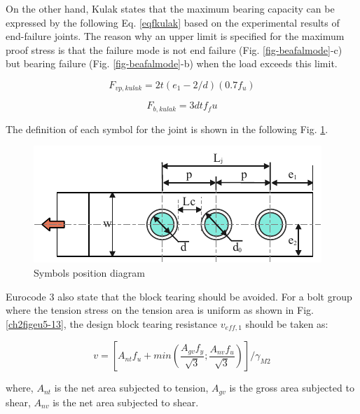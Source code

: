 On the other hand, Kulak \cite{Kulak1988guide} states that the maximum bearing capacity can be expressed by the following Eq. \ref{eqfkulak} based on the experimental results of end-failure joints. The reason why an upper limit is specified for the maximum proof stress is that the failure mode is not end failure (Fig. \ref{fig-beafalmode}-c) but bearing failure (Fig. \ref{fig-beafalmode}-b) when the load exceeds this limit.

\begin{equation}\label{eqfkulak}
    F_{vp,kulak}=2t(e_1-2/d)(0.7f_u)
\end{equation}

\begin{equation}
    F_{b,kulak}=3dtf_fu
\end{equation}

The definition of each symbol for the joint is shown in the following Fig. \ref{fig-symbol}.

\begin{figure}[htbp]
    \centering
    \includegraphics[width=0.7\linewidth]{imgs//ch2/symbol.pdf}
    \caption{Symbols position diagram}
    \label{fig-symbol}
\end{figure}

Eurocode 3 also state that the block tearing should be avoided. For a bolt group where the tension stress on the tension area is uniform as shown in Fig. \ref{ch2figeu5-13}, the design block tearing resistance $v_{eff,1}$ should be taken as:

\begin{equation}
    v=[A_{nt}f_u+min(\frac{A_{gv}f_y}{\sqrt{3}}; \frac{A_{nv}f_u}{\sqrt{3}})]/\gamma_{M2}
\end{equation}

where, $A_{nt}$ is the net area subjected to tension, $A_{gv}$ is the gross area subjected to shear, $A_{nv}$ is the net area subjected to shear.

